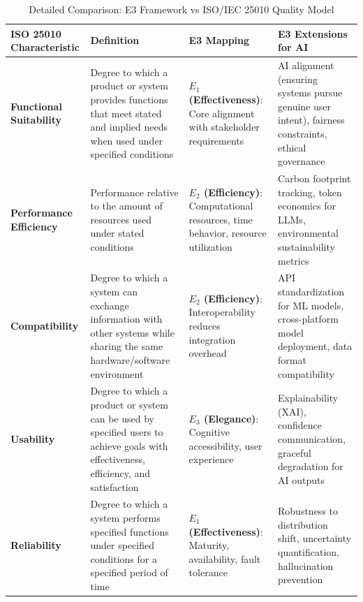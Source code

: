 
\begin{table}[t]
\centering
\caption{Detailed Comparison: E3 Framework vs ISO/IEC 25010 Quality Model}
\label{tab:iso25010_comparison}
\small
\begin{tabularx}{\textwidth}{@{}l X X X@{}}
\toprule
\textbf{ISO 25010 Characteristic} & \textbf{Definition} & \textbf{E3 Mapping} & \textbf{E3 Extensions for AI} \\
\midrule

\textbf{Functional Suitability} & 
Degree to which a product or system provides functions that meet stated and implied needs when used under specified conditions &
\textbf{$E_1$ (Effectiveness)}: Core alignment with stakeholder requirements &
AI alignment (ensuring systems pursue genuine user intent), fairness constraints, ethical governance \\

\addlinespace

\textbf{Performance Efficiency} & 
Performance relative to the amount of resources used under stated conditions &
\textbf{$E_2$ (Efficiency)}: Computational resources, time behavior, resource utilization &
Carbon footprint tracking, token economics for LLMs, environmental sustainability metrics \\

\addlinespace

\textbf{Compatibility} & 
Degree to which a system can exchange information with other systems while sharing the same hardware/software environment &
\textbf{$E_2$ (Efficiency)}: Interoperability reduces integration overhead &
API standardization for ML models, cross-platform model deployment, data format compatibility \\

\addlinespace

\textbf{Usability} & 
Degree to which a product or system can be used by specified users to achieve goals with effectiveness, efficiency, and satisfaction &
\textbf{$E_3$ (Elegance)}: Cognitive accessibility, user experience &
Explainability (XAI), confidence communication, graceful degradation for AI outputs \\

\addlinespace

\textbf{Reliability} & 
Degree to which a system performs specified functions under specified conditions for a specified period of time &
\textbf{$E_1$ (Effectiveness)}: Maturity, availability, fault tolerance &
Robustness to distribution shift, uncertainty quantification, hallucination prevention \\


\end{tabularx}
\end{table}
